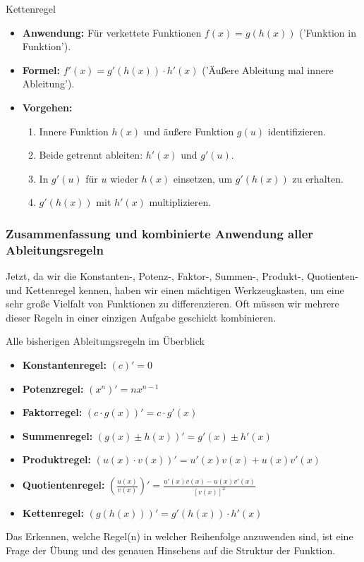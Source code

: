 \begin{kurzknappumgebung}{Kettenregel}
\begin{itemize}
    \item \textbf{Anwendung:} Für verkettete Funktionen $f(x) = g(h(x))$ ('Funktion in Funktion').
    \item \textbf{Formel:} $f'(x) = g'(h(x)) \cdot h'(x)$ ('Äußere Ableitung mal innere Ableitung').
    \item \textbf{Vorgehen:}
        \begin{enumerate}
            \item Innere Funktion $h(x)$ und äußere Funktion $g(u)$ identifizieren.
            \item Beide getrennt ableiten: $h'(x)$ und $g'(u)$.
            \item In $g'(u)$ für $u$ wieder $h(x)$ einsetzen, um $g'(h(x))$ zu erhalten.
            \item $g'(h(x))$ mit $h'(x)$ multiplizieren.
        \end{enumerate}
\end{itemize}
\end{kurzknappumgebung}


\subsubsection{Zusammenfassung und kombinierte Anwendung aller Ableitungsregeln}
\label{subsubsec:anwendung_aller_regeln_neu} %

Jetzt, da wir die Konstanten-, Potenz-, Faktor-, Summen-, Produkt-, Quotienten- und Kettenregel kennen, haben wir einen mächtigen Werkzeugkasten, um eine sehr große Vielfalt von Funktionen zu differenzieren. Oft müssen wir mehrere dieser Regeln in einer einzigen Aufgabe geschickt kombinieren.

\begin{kurzknappumgebung}{Alle bisherigen Ableitungsregeln im Überblick}
\begin{itemize}
    \item \textbf{Konstantenregel:} $(c)' = 0$
    \item \textbf{Potenzregel:} $(x^n)' = nx^{n-1}$
    \item \textbf{Faktorregel:} $(c \cdot g(x))' = c \cdot g'(x)$
    \item \textbf{Summenregel:} $(g(x) \pm h(x))' = g'(x) \pm h'(x)$
    \item \textbf{Produktregel:} $(u(x) \cdot v(x))' = u'(x)v(x) + u(x)v'(x)$
    \item \textbf{Quotientenregel:} $\left(\frac{u(x)}{v(x)}\right)' = \frac{u'(x)v(x) - u(x)v'(x)}{[v(x)]^2}$
    \item \textbf{Kettenregel:} $(g(h(x)))' = g'(h(x)) \cdot h'(x)$
\end{itemize}
Das Erkennen, welche Regel(n) in welcher Reihenfolge anzuwenden sind, ist eine Frage der Übung und des genauen Hinsehens auf die Struktur der Funktion.
\end{kurzknappumgebung}

